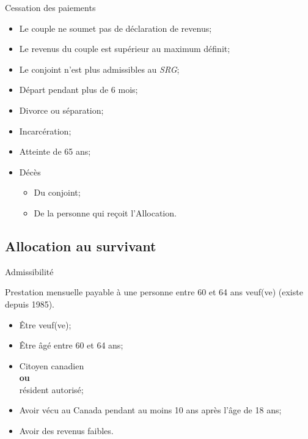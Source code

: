\documentclass[10pt, french]{article}
\begin{document}
\begin{multicols*}{3}
\begin{conceptgen}{Cessation des paiements}
	\begin{itemize}[leftmargin = *]
		\item	Le couple ne soumet pas de déclaration de revenus;
		\item 	Le revenus du couple est supérieur au maximum définit;
		\item 	Le conjoint n'est plus admissibles au \textit{SRG};
		\item 	Départ pendant plus de 6 mois;
		\item 	Divorce ou séparation;
		\item 	Incarcération;
		\item	Atteinte de 65 ans;
		\item	Décès
			\begin{itemize}[leftmargin = *]
			\item	Du conjoint;
			\item 	De la personne qui reçoit l'Allocation.
			\end{itemize}
	\end{itemize}
\end{conceptgen}

\columnbreak

\subsection{Allocation au survivant}
\label{sec:Alloc_survival}
\begin{conceptgen}{Admissibilité}

\begin{definitionNOHFILL}[Définition]
Prestation mensuelle payable à une personne entre 60 et 64 ans veuf(ve) (existe depuis 1985).
\end{definitionNOHFILL}

\begin{itemize}[leftmargin = *]
	\item	Être veuf(ve);
	\item	Être âgé entre 60 et 64 ans;
	\item	Citoyen canadien \\
			\textbf{ou}\\
			résident autorisé;			
	\item	Avoir vécu au Canada pendant au moins 10 ans après l'âge de 18 ans;
	\item	Avoir des revenus faibles.
\end{itemize}
\end{conceptgen}


\end{multicols*}
\end{document}
